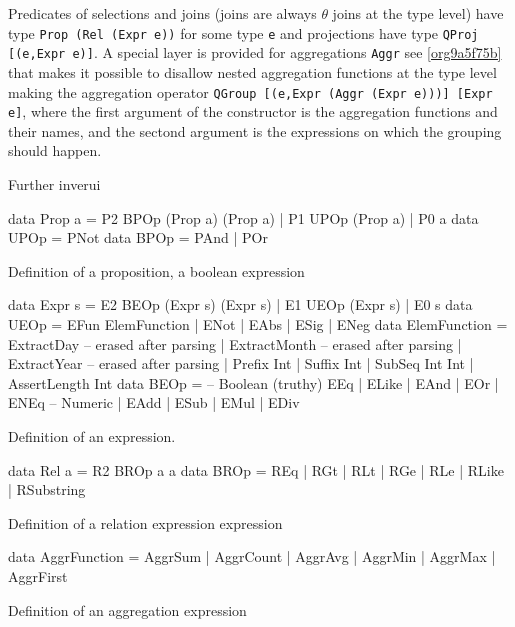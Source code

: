 Predicates of selections and joins (joins are always \(\theta\) joins
at the type level) have type \texttt{Prop (Rel (Expr e))} for some type \texttt{e}
and projections have type \texttt{QProj [(e,Expr e)]}. A special layer is
provided for aggregations \texttt{Aggr} see \ref{org9a5f75b} that makes it
possible to disallow nested aggregation functions at the type level
making the aggregation operator \texttt{QGroup [(e,Expr (Aggr (Expr e)))]
  [Expr e]}, where the first argument of the constructor is the
aggregation functions and their names, and the sectond argument is the
expressions on which the grouping should happen.

Further inverui

\begin{listing}[p]
  \begin{haskell}
    data Prop a = P2 BPOp (Prop a) (Prop a)
      | P1 UPOp (Prop a)
      | P0 a
    data UPOp = PNot
    data BPOp = PAnd | POr
  \end{haskell}
  \caption{\label{org9949756}Definition of a proposition, a boolean expression}
\end{listing}

\begin{listing}[p]
  \begin{haskell}
    data Expr s = E2 BEOp (Expr s) (Expr s)
      | E1 UEOp (Expr s)
      | E0 s
    data UEOp =
      EFun ElemFunction
      | ENot
      | EAbs
      | ESig
      | ENeg
    data ElemFunction
      = ExtractDay -- erased after parsing
      | ExtractMonth -- erased after parsing
      | ExtractYear -- erased after parsing
      | Prefix Int
      | Suffix Int
      | SubSeq Int Int
      | AssertLength Int
    data BEOp =
      -- Boolean (truthy)
      EEq
      | ELike
      | EAnd
      | EOr
      | ENEq
      -- Numeric
      | EAdd
      | ESub
      | EMul
      | EDiv
  \end{haskell}
  \caption{\label{org66d9c80}Definition of an expression.}
\end{listing}

\begin{listing}[p]
  \begin{haskell}
    data Rel a = R2 BROp a a
    data BROp
      = REq
      | RGt
      | RLt
      | RGe
      | RLe
      | RLike
      | RSubstring
  \end{haskell}
  \caption{\label{orge4b33ce}Definition of a relation expression expression}
\end{listing}

\begin{listing}[p]
  \begin{haskell}
    data AggrFunction = AggrSum
      | AggrCount
      | AggrAvg
      | AggrMin
      | AggrMax
      | AggrFirst
    \end{haskell}
  \caption{\label{org9a5f75b}Definition of an aggregation expression}
\end{listing}


